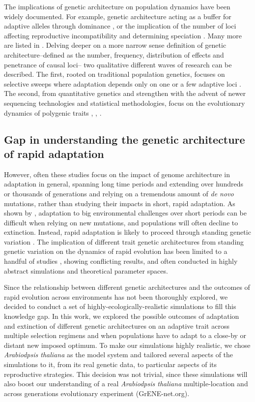 \documentclass{article}
\begin{document}
The implications of genetic architecture on population dynamics have been widely documented. For example, genetic architecture acting as a buffer for adaptive alleles through dominance \citep{Yamamichi2017-uj}, or the implication of the number of loci affecting reproductive incompatibility and determining speciation \citep{Orr1996-eq}. Many more are listed in \citep{Bertram2019-sg}. Delving deeper on a more narrow sense definition of genetic architecture--defined as the number, frequency, distribution of effects and penetrance of causal loci-- two qualitative different waves of research can be described. The first, rooted on traditional population genetics, focuses on selective sweeps where adaptation depends only on one or a few adaptive loci \citep{Hermisson2005-ii,Barrett2008-tj}. The second, from quantitative genetics and strengthen with the advent of newer sequencing technologies and statistical methodologies, focus on the evolutionary dynamics of polygenic traits \citep{John2020-xc}  \citep{Jain2017-mb}, \citep{Barghi2020-aa} \citep{Hayward2021-ji, Stetter2018-st, Thornton2019-ww},  \citep{Hollinger2019-lb}. 

\subsection{Gap in understanding the genetic architecture of rapid adaptation}
However, often these studies focus on the impact of genome architecture in adaptation in general, spanning long time periods and extending over hundreds or thousands of generations and relying on a tremendous amount of \textit{de novo} mutations, rather than studying their impacts in short, rapid adaptation. As shown by \citep{Orr2008-jl}, adaptation to big environmental challenges over short periods can be difficult when relying on new mutations, and populations will often decline to extinction. Instead, rapid adaptation is likely to proceed through standing genetic variation \citep{Barrett2008-tj}. The implication of different trait genetic architectures from standing genetic variation on the dynamics of rapid evolution has been limited to a handful of studies \citep{Gomulkiewicz2010-wr, Kardos2021-jd}, showing conflicting results, and often conducted in highly abstract simulations and theoretical parameter spaces.

Since the relationship between different genetic architectures and the outcomes of rapid evolution across environments has not been thoroughly explored, we decided to conduct a set of highly-ecologically-realistic simulations to fill this knowledge gap. In this work, we explored the possible outcomes of adaptation and extinction of different genetic architectures on an adaptive trait across multiple selection regimens and when populations have to adapt to a close-by or distant new imposed optimum. To make our simulations highly realistic, we chose \textit{Arabiodpsis thaliana} as the model system and tailored several aspects of the simulations to it, from its real genetic data, to particular aspects of its reproductive strategies. This decision was not trivial, since these simulations will also boost our understanding of a real \textit{Arabiodpsis thaliana} multiple-location and across generations evolutionary experiment (GrENE-net.org). 
\end{document}
